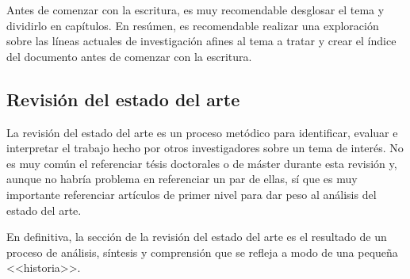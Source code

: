 Antes de comenzar con la escritura, es muy recomendable desglosar el tema y dividirlo en capítulos. En resúmen, es recomendable realizar una exploración sobre las líneas actuales de investigación afines al tema a tratar y crear el índice del documento antes de comenzar con la escritura.




\subsection{Revisión del estado del arte}
La revisión del estado del arte es un proceso metódico para identificar, evaluar e interpretar el trabajo hecho por otros investigadores sobre un tema de interés. No es muy común el referenciar tésis doctorales o de máster durante esta revisión y, aunque no habría problema en referenciar un par de ellas, sí que es muy importante referenciar artículos de primer nivel para dar peso al análisis del estado del arte.

En definitiva, la sección de la revisión del estado del arte es el resultado de un proceso de análisis, síntesis y comprensión que se refleja a modo de una pequeña <<historia>>.


